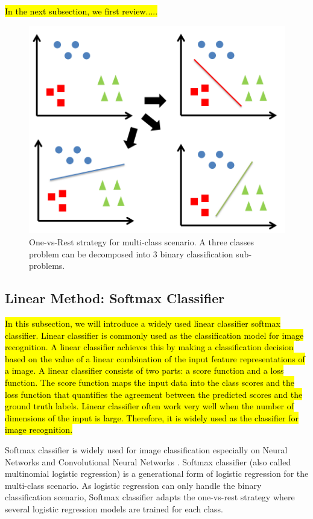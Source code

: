 \hl{In the next subsection, we first review.....}
\begin{figure}
	\centering
	\includegraphics[scale=.7]{relatedwork/fig/ovsa.png}
	\caption{One-vs-Rest strategy for multi-class scenario. A three classes problem can be decomposed into 3 binary classification sub-problems.}\label{fig:related:ovsa}
\end{figure}
\subsection{Linear Method: Softmax Classifier}
\hl{In this subsection, we will introduce a widely used linear classifier softmax classifier. Linear classifier is commonly used as the classification model for image recognition. A linear classifier achieves this by making a classification decision based on the value of a linear combination of the input feature representations of a image. A linear classifier consists of two parts: a score function and a loss function. The score function maps the input data into the class scores and the loss function that quantifies the agreement between the predicted scores and the ground truth labels. Linear classifier often work very well when the number of dimensions of the input is large. Therefore, it is widely used as the classifier for image recognition.} 

Softmax classifier is widely used for image classification especially on Neural Networks and Convolutional Neural Networks \cite{lecun1989backpropagation}.
Softmax classifier (also called multinomial logistic regression) is a generational form of logistic regression for the multi-class scenario. As logistic regression can only handle the binary classification scenario, Softmax classifier adapts the one-vs-rest strategy where several logistic regression models are trained for each class. 


